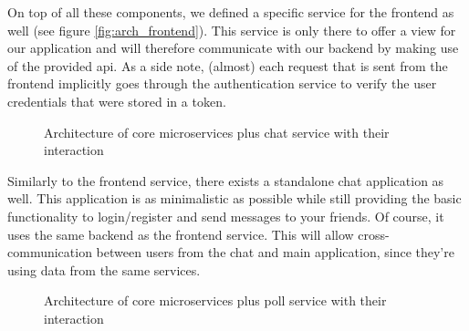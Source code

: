 \documentclass{article}
\begin{document}
On top of all these components, we defined a specific service for the frontend as well (see figure \ref{fig:arch_frontend}). This service is only there to offer a view for our application and will therefore communicate with our backend by making use of the provided api. As a side note, (almost) each request that is sent from the frontend implicitly goes through the authentication service to verify the user credentials that were stored in a token.

\begin{figure}[H]
    \begin{center}
    \end{center}
    \caption{Architecture of core microservices plus chat service with their interaction}
    \label{fig:arch_chat}
\end{figure}

Similarly to the frontend service, there exists a standalone chat application as well. This application is as minimalistic as possible while still providing the basic functionality to login/register and send messages to your friends. Of course, it uses the same backend as the frontend service. This will allow cross-communication between users from the chat and main application, since they're using data from the same services.

\begin{figure}[H]
    \begin{center}
    \end{center}
    \caption{Architecture of core microservices plus poll service with their interaction}
    \label{fig:arch_poll}
\end{figure}
\end{document}
